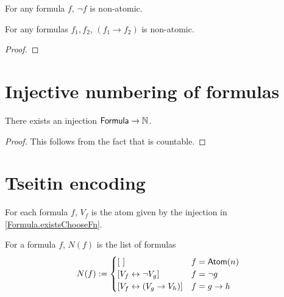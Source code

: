 \begin{lemma}
    \label{NonAtomic.neg}
    \leanok
    For any formula $f$, $\neg f$ is non-atomic.
\end{lemma}

\begin{lemma}
    \label{NonAtomic.imp}
    \leanok
    For any formulas $f_1, f_2$, $(f_1 \to f_2)$ is non-atomic.
\end{lemma}
\begin{proof}
    \leanok
\end{proof}

\section{Injective numbering of formulas}

\begin{lemma}
    \label{Formula.existsChooseFn}
    \leanok
    There exists an injection $\mathsf{Formula} \to \mathbb{N}$.
\end{lemma}
\begin{proof}
    \leanok
    This follows from the fact that \Formula{} is countable.
\end{proof}

\section{Tseitin encoding}

\begin{definition}
    \label{Tseitin.V}
    \leanok
    For each formula $f$, $V_f$ is the atom given by the injection in \ref{Formula.existsChooseFn}.
\end{definition}

\begin{definition}
    \label{Tseitin.N}
    \leanok
    For a formula $f$, $N(f)$ is the list of formulas
    \[
    N(f) := \begin{cases}
        [\ ] & f = \mathsf{Atom}(n) \\
        \left[ V_f \leftrightarrow \neg V_g \right] & f = \neg g \\
        \left[ V_f \leftrightarrow (V_g \to V_h) \right] & f = g \to h
    \end{cases}
    \]
\end{definition}


